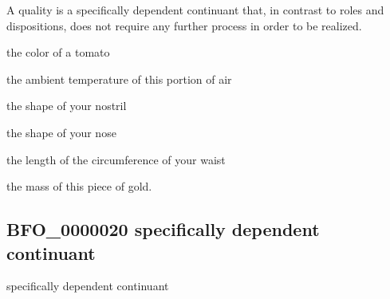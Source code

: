 \documentclass[letterpaper,10pt,english]{sphinxmanual}
\begin{document}
\begin{sphinxShadowBox}

\sphinxAtStartPar
{\hyperref[\detokenize{doc-BFO_0000017::doc}]{}}
\end{sphinxShadowBox}

\begin{sphinxShadowBox}

\sphinxAtStartPar
A quality is a specifically dependent continuant that, in contrast to roles and dispositions, does not require any further process in order to be realized.
\end{sphinxShadowBox}

\begin{sphinxShadowBox}

\sphinxAtStartPar
the color of a tomato

\sphinxAtStartPar
the ambient temperature of this portion of air

\sphinxAtStartPar
the shape of your nostril

\sphinxAtStartPar
the shape of your nose

\sphinxAtStartPar
the length of the circumference of your waist

\sphinxAtStartPar
the mass of this piece of gold.
\end{sphinxShadowBox}

\begin{sphinxShadowBox}

\sphinxAtStartPar
{}
\end{sphinxShadowBox}
\begin{quote}

\ignorespaces \end{quote}


\subsection{BFO\_0000020 \sphinxhyphen{} specifically dependent continuant}
\label{\detokenize{doc-BFO_0000020:bfo-0000020-specifically-dependent-continuant}}\label{\detokenize{doc-BFO_0000020:index-0}}\label{\detokenize{doc-BFO_0000020::doc}}
\begin{sphinxShadowBox}

\sphinxAtStartPar
specifically dependent continuant
\end{sphinxShadowBox}
\end{document}
